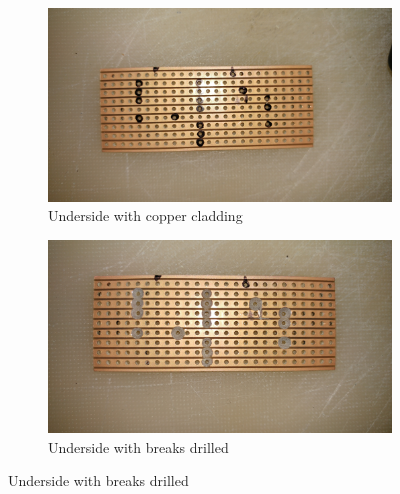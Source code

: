 \documentclass[bsc,frontabs,twoside,singlespacing,parskip,deptreport]{infthesis}
\begin{document}
\begin{figure}[ht]
\begin{subfigure}{.5\textwidth}
\includegraphics[width=.8\linewidth]{20161230_150858.jpg} 
\caption{Underside with copper cladding}
\end{subfigure}
\begin{subfigure}{.5\textwidth}
\includegraphics[width=.8\linewidth]{20161230_151405.jpg}
\caption{Underside with breaks drilled}
\end{subfigure}


\end{figure}
\end{document}
